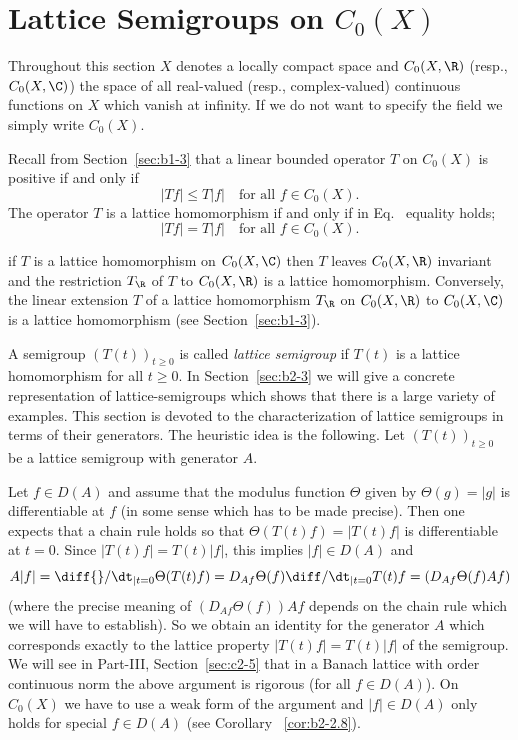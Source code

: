 \section{Lattice Semigroups on  \texorpdfstring{$C_{0}(X)$}{C\textsubscript{0}(X)}}\label{sec:b2-2}%
Throughout this section $X$ denotes a locally compact space and $C_{0}(X,\R)$ (resp., $C_{0}(X,\C)$) the space of all real-valued (resp., complex-valued) continuous functions on $X$ which vanish at infinity.
If we do not want to specify the field we simply write $C_{0}(X)$.

Recall from  Section~\ref{sec:b1-3} that a linear bounded operator $T$ on $C_{0}(X)$ is positive if and only if
\begin{equation}\label{eq:b2-2.1}
|Tf| \leq T|f| \quad \text{for all } f \in C_{0}(X).
\end{equation}
The operator $T$ is a lattice homomorphism if and only if in Eq.~ equality holds; \ie 
\begin{equation}\label{eq:b2-2.2}
|Tf| = T|f| \quad \text{for all } f \in C_{0}(X).
\end{equation}

\begin{remark}\label{rem:b2-2.1}
if\/ $T$ is a lattice homomorphism on $C_{0}(X,\C)$ then $T$ leaves $C_{0}(X,\R)$ invariant and the restriction $T_{\R}$ of\/ $T$ to $C_{0}(X,\R)$ is a lattice homomorphism.
Conversely, the linear extension $T$ of a lattice homomorphism $T_{\R}$ on $C_{0}(X,\R)$ to $C_{0}(X,\C)$ is a lattice homomorphism (see Section~\ref{sec:b1-3}).
\end{remark}

A semigroup $(T(t))_{t \geq 0}$ is called \emph{lattice semigroup} if\/ $T(t)$ is a lattice homomorphism for all $t \geq 0$.
In Section~\ref{sec:b2-3} we will give a concrete representation of lattice-semigroups which shows that there is a large variety of examples.
This section is devoted to the characterization of lattice semigroups in terms of their generators.
The heuristic idea is the following.
Let $(T(t))_{t \geq 0}$ be a lattice semigroup with generator $A$.

Let $f \in D(A)$ and assume that the modulus function $\Theta$ given by $\Theta(g) = |g|$ is differentiable at $f$ (in some sense which has to be made precise).
Then one expects that a chain rule holds so that $\Theta(T(t)f) = |T(t)f|$ is differentiable at $t = 0$.
Since $|T(t)f| = T(t)|f|$, this implies $|f| \in D(A)$ and 
\[
A|f| = \diff{}/\dt_{|t=0} \Theta(T(t)f) = D_{Af}\Theta(f)\diff/\dt_{|t=0}T(t)f = (D_{Af}\Theta(f)Af)
\]
 (where the precise meaning of\/ $(D_{Af}\Theta(f))Af$  
 depends on the chain rule which we will have to establish).
So we obtain an identity for the generator $A$ which corresponds exactly to the lattice property $|T(t)f| = T(t)|f|$ of the semigroup.
We will see in Part-III, Section~\ref{sec:c2-5} that in a Banach lattice with order continuous norm the above argument is rigorous (for all $f \in D(A)$).
On $C_{0}(X)$ we have to use a weak form of the argument and $|f| \in D(A)$ only holds for special $f \in D(A)$ (see Corollary ~\ref{cor:b2-2.8}).

